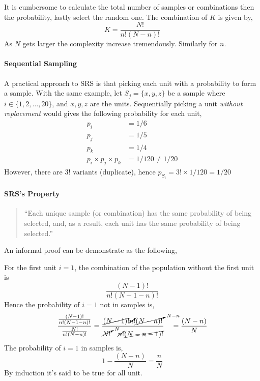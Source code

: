 It is cumbersome to calculate the total number of samples or combinations then the probability, lastly select the random one. The combination of $K$ is given by,
\begin{equation}
    K=\frac{N!}{n!(N-n)!}
\end{equation}
As $N$ gets larger the complexity increase tremendously. Similarly for $n$.

\paragraph{Sequential Sampling}
A practical approach to SRS is that picking each unit with a probability to form a sample. With the same example, let $S_j=\{x,y,z\}$ be a sample where $i\in\{1,2,\ldots,20\}$, and $x,y,z$ are the units. Sequentially
picking a unit \emph{without replacement} would gives the following probability for each unit,
\begin{equation*}
    \begin{aligned}
        p_i&=1/6\\
        p_j&=1/5\\
        p_k&=1/4\\
        p_i\times p_j\times p_k&=1/120\neq1/20
    \end{aligned}
\end{equation*}
However, there are $3!$ variants (duplicate), hence $p_{S_i}=3!\times1/120=1/20$

\paragraph{SRS's Property}
\begin{quote}
    ``Each unique sample (or combination) has the same probability of being selected, and, as a result, each unit has the same probability of being selected.''
\end{quote}
An informal proof can be demonstrate as the following,
\begin{proofbox}
    For the first unit $i=1$, the combination of the population without the first unit is
    \begin{equation*}
        \frac{(N-1)!}{n!(N-1-n)!}
    \end{equation*}
    Hence the probability of $i=1$ not in samples is,
    \begin{equation*}
        \frac{\frac{(N-1)!}{n!(N-1-n)!}}{\frac{N!}{n!(N-n)!}}=\frac{\cancel{(N-1)!}\cancel{n!}\cancelto{N-n}{(N-n)!}}{\cancelto{N}{N!}\quad\cancel{n!}\cancel{(N-n-1)!}}\quad=\frac{(N-n)}{N}
    \end{equation*}
    The probability of $i=1$ in samples is,
    \begin{equation*}
        1-\frac{(N-n)}{N}=\frac{n}{N}
    \end{equation*}
    By induction it's said to be true for all unit.
\end{proofbox}

